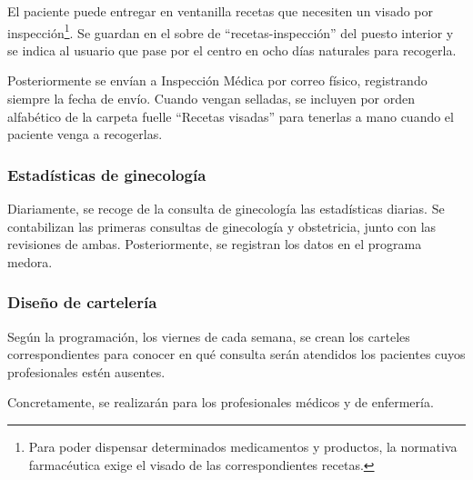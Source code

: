El paciente puede entregar en ventanilla recetas que necesiten un visado por inspección\footnote{Para poder dispensar determinados medicamentos y productos, la normativa farmacéutica exige el visado de las correspondientes recetas.}.
Se guardan en el sobre de ``recetas-inspección'' del puesto interior y se indica al usuario que pase por el centro en ocho días naturales para recogerla.

Posteriormente se envían a Inspección Médica por correo físico, registrando siempre la fecha de envío.
Cuando vengan selladas, se incluyen por orden alfabético de la carpeta fuelle ``Recetas visadas'' para tenerlas a mano cuando el paciente venga a recogerlas.

\subsubsection{Estadísticas de ginecología}

Diariamente, se recoge de la consulta de ginecología las estadísticas diarias.
Se contabilizan las primeras consultas de ginecología y obstetricia, junto con las revisiones de ambas.
Posteriormente, se registran los datos en el programa \Gls{medora}.




\subsubsection{Diseño de cartelería}

Según la programación, los viernes de cada semana, se crean los carteles correspondientes para conocer en qué consulta serán atendidos los pacientes cuyos profesionales estén ausentes.

Concretamente, se realizarán para los profesionales médicos y de enfermería.

